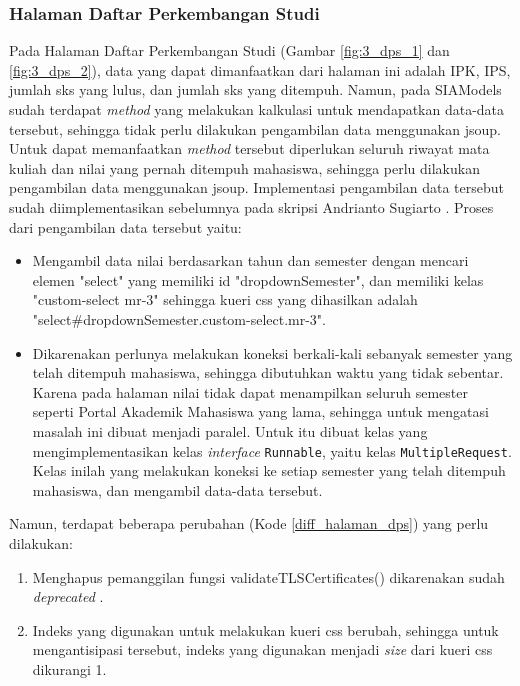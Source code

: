 \subsubsection{Halaman Daftar Perkembangan Studi}
Pada Halaman Daftar Perkembangan Studi (Gambar \ref{fig:3_dps_1} dan \ref{fig:3_dps_2}), data yang dapat dimanfaatkan dari halaman ini adalah IPK, IPS, jumlah sks yang lulus, dan jumlah sks yang ditempuh. Namun, pada SIAModels sudah terdapat \textit{method} yang melakukan kalkulasi untuk mendapatkan data-data tersebut, sehingga tidak perlu dilakukan pengambilan data menggunakan jsoup. Untuk dapat memanfaatkan \textit{method} tersebut diperlukan seluruh riwayat mata kuliah dan nilai yang pernah ditempuh mahasiswa, sehingga perlu dilakukan pengambilan data menggunakan jsoup.  Implementasi pengambilan data tersebut sudah diimplementasikan sebelumnya pada skripsi Andrianto Sugiarto \cite{ifstupor}. Proses dari pengambilan data tersebut yaitu:
    \begin{itemize}
        \item Mengambil data nilai berdasarkan tahun dan semester dengan mencari elemen "select" yang memiliki id "dropdownSemester", dan memiliki kelas "custom-select mr-3" sehingga kueri css yang dihasilkan adalah "select\#dropdownSemester.custom-select.mr-3".
        \item Dikarenakan perlunya melakukan koneksi berkali-kali sebanyak semester yang telah ditempuh mahasiswa, sehingga dibutuhkan waktu yang tidak sebentar. Karena pada halaman nilai tidak dapat menampilkan seluruh semester seperti Portal Akademik Mahasiswa yang lama, sehingga untuk mengatasi masalah ini dibuat menjadi paralel. Untuk itu dibuat kelas yang mengimplementasikan kelas \textit{interface} \texttt{Runnable}, yaitu kelas \texttt{MultipleRequest}. Kelas inilah yang melakukan koneksi ke setiap semester yang telah ditempuh mahasiswa, dan mengambil data-data tersebut.
    \end{itemize}
    Namun, terdapat beberapa perubahan (Kode \ref{diff_halaman_dps}) yang perlu dilakukan:
    \begin{enumerate}
        \item Menghapus pemanggilan fungsi validateTLSCertificates() dikarenakan sudah \textit{deprecated} \cite{jsoup}.
        \item Indeks yang digunakan untuk melakukan kueri css berubah, sehingga untuk mengantisipasi tersebut, indeks yang digunakan menjadi \textit{size} dari kueri css dikurangi 1.
    \end{enumerate}
        
